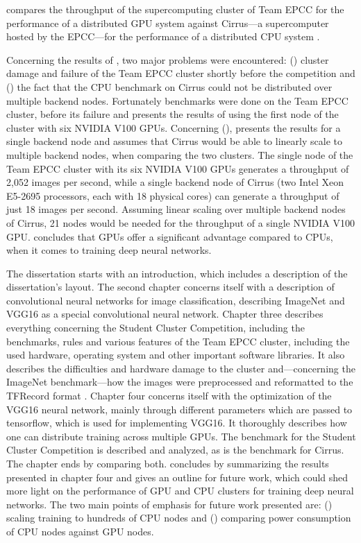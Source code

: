 \documentclass{article}
\begin{document}
\citet{nita_2018} compares the throughput of the
supercomputing cluster of Team EPCC for the performance of
a distributed GPU system against Cirrus---a supercomputer
hosted by the EPCC---for the performance of a distributed
CPU system \citep{cirrus}.

Concerning the results of \citet{nita_2018}, two major
problems were encountered: () cluster
damage and failure of the Team EPCC cluster shortly before
the competition and () the fact that the CPU
benchmark on Cirrus could not be distributed over multiple
backend nodes.
Fortunately benchmarks were done on the Team EPCC cluster,
before its failure and \citet{nita_2018} presents the
results of using the first node of the cluster with six
NVIDIA V100 GPUs.
Concerning (), \citet{nita_2018} presents
the results for a single backend node and assumes that
Cirrus would be able to linearly scale to multiple backend
nodes, when comparing the two clusters.
The single node of the Team EPCC cluster with its six
NVIDIA V100 GPUs generates a throughput of 2,052 images per
second, while a single backend node of Cirrus (two Intel
Xeon E5-2695 processors, each with 18 physical cores) can
generate a throughput of just 18 images per second.
Assuming linear scaling over multiple backend nodes of
Cirrus, 21 nodes would be needed for the throughput of a
single NVIDIA V100 GPU.
\citet{nita_2018} concludes that GPUs offer a significant
advantage compared to CPUs, when it comes to training
deep neural networks.

The dissertation starts with an introduction, which
includes a description of the dissertation's layout.
The second chapter concerns itself with a description of
convolutional neural networks for image classification,
describing ImageNet and VGG16 as a special convolutional
neural network.
Chapter three describes everything concerning the Student
Cluster Competition, including the benchmarks, rules and
various features of the Team EPCC cluster, including the
used hardware, operating system and other important
software libraries.
It also describes the difficulties and hardware damage to
the cluster and---concerning the ImageNet benchmark---how
the images were preprocessed and reformatted to the
TFRecord format \citep{tf2015}.
Chapter four concerns itself with the optimization of the
VGG16 neural network, mainly through different parameters
which are passed to tensorflow, which is used for
implementing VGG16.
It thoroughly describes how one can distribute training
across multiple GPUs.
The benchmark for the Student Cluster Competition is
described and analyzed, as is the benchmark for Cirrus.
The chapter ends by comparing both.
\citet{nita_2018} concludes by summarizing the results
presented in chapter four and gives an outline for future
work, which could shed more light on the performance of
GPU and CPU clusters for training deep neural networks.
The two main points of emphasis for future work presented
are: () scaling training to hundreds of
CPU nodes \citep[see e.g.][for distributing training onto
multiple CPUs]{you2017} and ()
comparing power consumption of CPU nodes against GPU nodes.
\end{document}
